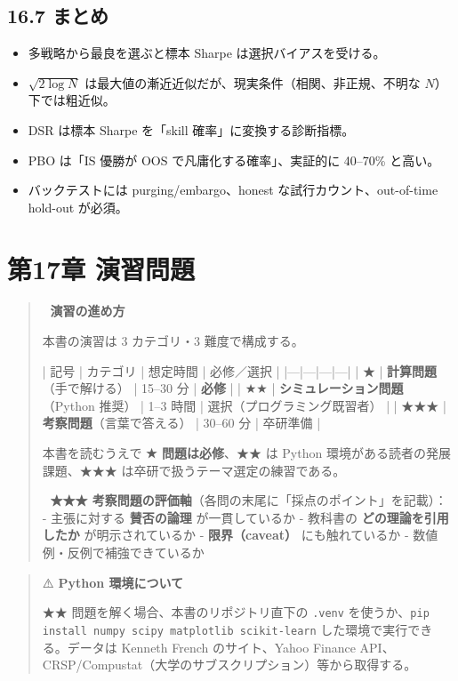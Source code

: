 \documentclass[11pt,a4paper]{report}
\begin{document}
\section{16.7 まとめ}

\begin{itemize}
\item 多戦略から最良を選ぶと標本 Sharpe は選択バイアスを受ける。
\item $\sqrt{2 \log N}$ は最大値の漸近近似だが、現実条件（相関、非正規、不明な $N$）下では粗近似。
\item DSR は標本 Sharpe を「skill 確率」に変換する診断指標。
\item PBO は「IS 優勝が OOS で凡庸化する確率」、実証的に 40–70\% と高い。
\item バックテストには purging/embargo、honest な試行カウント、out-of-time hold-out が必須。
\end{itemize}

\noindent\hrulefill

\chapter{第17章 演習問題}

\begin{quote}
🎯 \textbf{演習の進め方}

本書の演習は 3 カテゴリ・3 難度で構成する。

| 記号 | カテゴリ | 想定時間 | 必修／選択 |
|---|---|---|---|
| ★ | \textbf{計算問題}（手で解ける） | 15–30 分 | \textbf{必修} |
| ★★ | \textbf{シミュレーション問題}（Python 推奨） | 1–3 時間 | 選択（プログラミング既習者） |
| ★★★ | \textbf{考察問題}（言葉で答える） | 30–60 分 | 卒研準備 |

本書を読むうえで \textbf{★ 問題は必修}、★★ は Python 環境がある読者の発展課題、★★★ は卒研で扱うテーマ選定の練習である。

📝 \textbf{★★★ 考察問題の評価軸}（各問の末尾に「採点のポイント」を記載）：
- 主張に対する \textbf{賛否の論理} が一貫しているか
- 教科書の \textbf{どの理論を引用したか} が明示されているか
- \textbf{限界（caveat）} にも触れているか
- 数値例・反例で補強できているか
\end{quote}

\begin{quote}
⚠️ \textbf{Python 環境について}

★★ 問題を解く場合、本書のリポジトリ直下の \texttt{.venv} を使うか、\texttt{pip install numpy scipy matplotlib scikit-learn} した環境で実行できる。データは Kenneth French のサイト、Yahoo Finance API、CRSP/Compustat（大学のサブスクリプション）等から取得する。
\end{quote}
\end{document}
